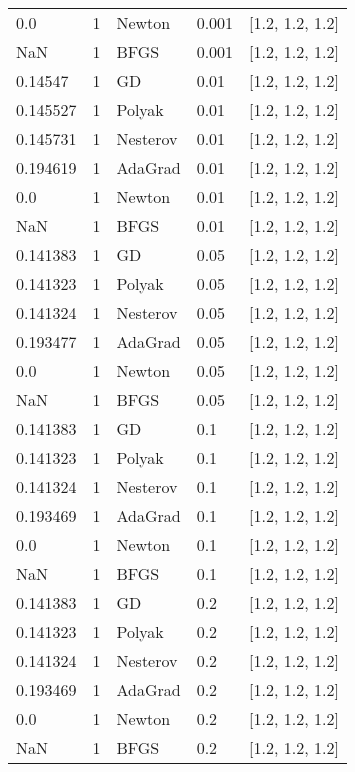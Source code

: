 \begin{tabular}{lllll}
      0.0 &        1 &   Newton &  0.001 &  [1.2, 1.2, 1.2] \\
      NaN &        1 &     BFGS &  0.001 &  [1.2, 1.2, 1.2] \\
  0.14547 &        1 &       GD &   0.01 &  [1.2, 1.2, 1.2] \\
 0.145527 &        1 &   Polyak &   0.01 &  [1.2, 1.2, 1.2] \\
 0.145731 &        1 & Nesterov &   0.01 &  [1.2, 1.2, 1.2] \\
 0.194619 &        1 &  AdaGrad &   0.01 &  [1.2, 1.2, 1.2] \\
      0.0 &        1 &   Newton &   0.01 &  [1.2, 1.2, 1.2] \\
      NaN &        1 &     BFGS &   0.01 &  [1.2, 1.2, 1.2] \\
 0.141383 &        1 &       GD &   0.05 &  [1.2, 1.2, 1.2] \\
 0.141323 &        1 &   Polyak &   0.05 &  [1.2, 1.2, 1.2] \\
 0.141324 &        1 & Nesterov &   0.05 &  [1.2, 1.2, 1.2] \\
 0.193477 &        1 &  AdaGrad &   0.05 &  [1.2, 1.2, 1.2] \\
      0.0 &        1 &   Newton &   0.05 &  [1.2, 1.2, 1.2] \\
      NaN &        1 &     BFGS &   0.05 &  [1.2, 1.2, 1.2] \\
 0.141383 &        1 &       GD &    0.1 &  [1.2, 1.2, 1.2] \\
 0.141323 &        1 &   Polyak &    0.1 &  [1.2, 1.2, 1.2] \\
 0.141324 &        1 & Nesterov &    0.1 &  [1.2, 1.2, 1.2] \\
 0.193469 &        1 &  AdaGrad &    0.1 &  [1.2, 1.2, 1.2] \\
      0.0 &        1 &   Newton &    0.1 &  [1.2, 1.2, 1.2] \\
      NaN &        1 &     BFGS &    0.1 &  [1.2, 1.2, 1.2] \\
 0.141383 &        1 &       GD &    0.2 &  [1.2, 1.2, 1.2] \\
 0.141323 &        1 &   Polyak &    0.2 &  [1.2, 1.2, 1.2] \\
 0.141324 &        1 & Nesterov &    0.2 &  [1.2, 1.2, 1.2] \\
 0.193469 &        1 &  AdaGrad &    0.2 &  [1.2, 1.2, 1.2] \\
      0.0 &        1 &   Newton &    0.2 &  [1.2, 1.2, 1.2] \\
      NaN &        1 &     BFGS &    0.2 &  [1.2, 1.2, 1.2] \\

\end{tabular}
